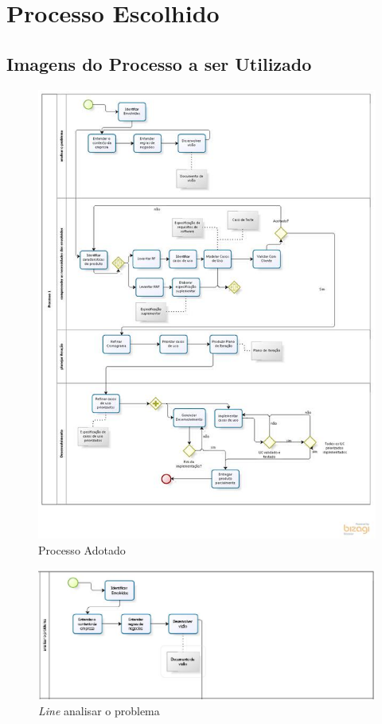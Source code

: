 \chapter{Processo Escolhido}
\label{chosen-process}

\section{Imagens do Processo a ser Utilizado}

\begin{figure}[htb]
\centering
  \includegraphics[keepaspectratio=true,scale=0.5]
  {figuras/processo_todo.eps}
  \caption{Processo Adotado}
  \label{process}
\end{figure}

\begin{figure}[htb]
\centering
 \includegraphics[keepaspectratio=true,scale=0.6]
  {figuras/analisar_problema.eps}
  \caption{\textit{Line} analisar o problema}
  \label{analyze}
\end{figure}

